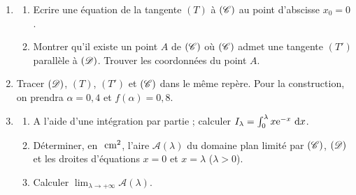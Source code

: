\begin{enumerate}
\begin{enumerate}
                        \item Etudier la position de $\Courbe$ par rapport \`a $\D$.
                  \end{enumerate}
            \item \begin{enumerate}
                        \item Ecrire une \'equation de la tangente $(T)$ \`a $\Courbe$ au point d'abscisse $x_0 = 0$.
                        \item Montrer qu'il existe un point $A$ de $\Courbe$ o\`u $\Courbe$ admet une 
                              tangente $(T')$ parall\`ele \`a $\D$. Trouver les coordonn\'ees du point $A$.
                  \end{enumerate}
            \item Tracer $\D$, $(T)$, $(T')$ et $\Courbe$ dans le m\^eme rep\`ere. 
                  Pour la construction, on prendra $\alpha = 0,4$ et $f(\alpha) = 0,8$.
            \item \begin{enumerate}
                        \item A l'aide d'une int\'egration par partie ; 
                              calculer $I_{\lambda} = \int_{0}^{\lambda} x \mathrm{e}^{-x} ~\mathrm{d}x$.
                        \item D\'eterminer, en $~\mathrm{cm} ^2$, l'aire $\mathscr{A}(\lambda)$ du domaine plan limit\'e par 
                              $\Courbe$, $\D$ et les droites d'\'equations $x = 0$ et $x = \lambda$ ($\lambda > 0$).
                        \item Calculer $\lim_{\lambda \rightarrow +\infty} \mathscr{A}(\lambda)$.
                  \end{enumerate}
      \end{enumerate}





